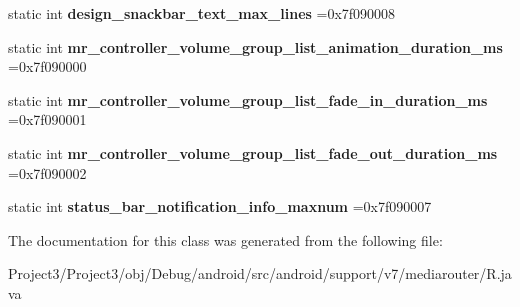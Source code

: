 \begin{DoxyCompactItemize}
static int {\bfseries design\+\_\+snackbar\+\_\+text\+\_\+max\+\_\+lines} =0x7f090008
\item 
\mbox{\label{classandroid_1_1support_1_1v7_1_1mediarouter_1_1R_1_1integer_a44d47d25a6ec1883150aa7827f64abe9}} 
static int {\bfseries mr\+\_\+controller\+\_\+volume\+\_\+group\+\_\+list\+\_\+animation\+\_\+duration\+\_\+ms} =0x7f090000
\item 
\mbox{\label{classandroid_1_1support_1_1v7_1_1mediarouter_1_1R_1_1integer_aa4730a108e1e1fc20106c181d7c002ce}} 
static int {\bfseries mr\+\_\+controller\+\_\+volume\+\_\+group\+\_\+list\+\_\+fade\+\_\+in\+\_\+duration\+\_\+ms} =0x7f090001
\item 
\mbox{\label{classandroid_1_1support_1_1v7_1_1mediarouter_1_1R_1_1integer_ae9fdecf54f0d551921923cd3a79d59e4}} 
static int {\bfseries mr\+\_\+controller\+\_\+volume\+\_\+group\+\_\+list\+\_\+fade\+\_\+out\+\_\+duration\+\_\+ms} =0x7f090002
\item 
\mbox{\label{classandroid_1_1support_1_1v7_1_1mediarouter_1_1R_1_1integer_a2a2040ed583e23874883bf279c8aced3}} 
static int {\bfseries status\+\_\+bar\+\_\+notification\+\_\+info\+\_\+maxnum} =0x7f090007
\end{DoxyCompactItemize}


The documentation for this class was generated from the following file\+:\begin{DoxyCompactItemize}
\item 
Project3/\+Project3/obj/\+Debug/android/src/android/support/v7/mediarouter/R.\+java\end{DoxyCompactItemize}
